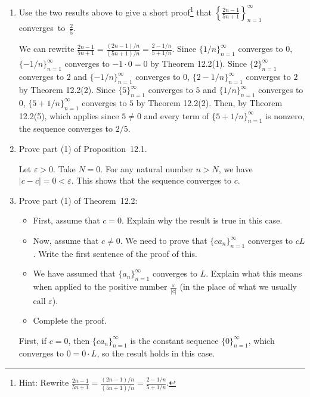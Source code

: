 \documentclass[12pt]{amsart}
\numberwithin{equation}{section}
\theoremstyle{plain} %
\theoremstyle{definition}
\theoremstyle{remark}
\begin{document}
\begin{enumerate}
\item Use the two results above to give a short proof\footnote{Hint: Rewrite $\displaystyle\frac{2n-1}{5n+1} = \frac{(2n-1)/n}{(5n+1)/n} = \frac{2-1/n}{5+1/n}$.} that $\displaystyle \left\{ \frac{2n-1}{5n+1} \right\}_{n=1}^\infty$\!\!\! converges~to~$\displaystyle  \frac{2}{5}$.

\begin{framed}
We can rewrite $\displaystyle\frac{2n-1}{5n+1} = \frac{(2n-1)/n}{(5n+1)/n} = \frac{2-1/n}{5+1/n}$. Since $\{1/n\}_{n=1}^\infty$ converges to $0$, $\{-1/n\}_{n=1}^\infty$ converges to $-1\cdot 0 = 0$ by Theorem 12.2(1). Since $\{2\}_{n=1}^\infty$ converges to $2$ and $\{-1/n\}_{n=1}^\infty$ converges to $0$, $\{2-1/n\}_{n=1}^\infty$ converges to $2$ by Theorem 12.2(2). Since $\{5\}_{n=1}^\infty$ converges to $5$ and $\{1/n\}_{n=1}^\infty$ converges to $0$, $\{5+1/n\}_{n=1}^\infty$ converges to $5$ by Theorem 12.2(2). Then, by Theorem 12.2(5), which applies since $5\neq 0$ and every term of $\{5+1/n\}_{n=1}^\infty$ is nonzero, the sequence converges to $2/5$.
\end{framed}

\item Prove part (1) of Proposition~12.1.

\begin{framed}
Let $\varepsilon>0$. Take $N=0$. For any natural number $n>N$, we have $|c-c|=0<\varepsilon$. This shows that the sequence converges to $c$.
\end{framed}

\item Prove part (1) of Theorem~12.2:
\begin{itemize}
\item First, assume that $c=0$. Explain why the result is true in this case.
\item Now, assume that $c\neq 0$. We need to prove that $\{ c a_n\}_{n=1}^\infty$ converges to $cL$. Write the first sentence of the proof of this.
\item We have assumed that $\{a_n\}_{n=1}^\infty$ converges to $L$. Explain what this means when applied to the positive number $\displaystyle \frac{\varepsilon}{|c|}$ (in the place of what we usually call $\varepsilon$).
\item Complete the proof.
\end{itemize}

\begin{framed}
First, if $c=0$, then $\{c a_n\}_{n=1}^\infty$ is the constant sequence $\{0\}_{n=1}^\infty$, which converges to $0 = 0\cdot L$, so the result holds in this case.


\end{framed}
\end{enumerate}
\end{document}
